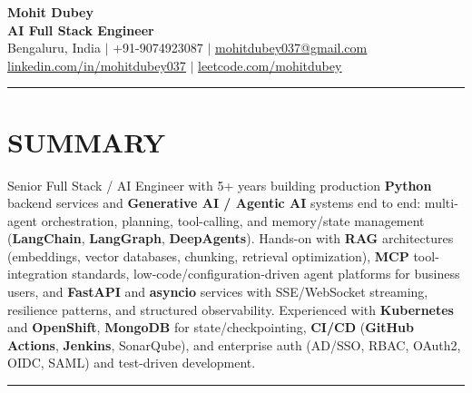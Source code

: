 \documentclass[a4paper]{article}
\newcommand{\sectionline}{
\begin{center}
\vspace{-9pt}
\rule{1\textwidth}{0.5pt}
\end{center}
\vspace{1pt}
}
\begin{document}
\begin{center}
    \textbf{\Huge Mohit Dubey} \\ \vspace{4pt}
    \textbf{AI Full Stack Engineer } \\ \vspace{6pt}
    \small Bengaluru, India $|$ +91-9074923087 $|$ \href{mailto:mohitdubey037@gmail.com}{\underline{mohitdubey037@gmail.com}} \\
    \href{https://www.linkedin.com/in/mohit-dubey-037/}{\underline{linkedin.com/in/mohitdubey037}} $|$ \href{https://leetcode.com/u/mohitdubey037/}
    {\underline{leetcode.com/mohitdubey}}
\end{center}


\sectionline
\section*{SUMMARY}
Senior Full Stack / AI Engineer with 5+ years building production \textbf{Python} backend services and \textbf{Generative AI / Agentic AI} systems end to end: multi-agent orchestration, planning, tool-calling, and memory/state management (\textbf{LangChain}, \textbf{LangGraph}, \textbf{DeepAgents}). Hands-on with \textbf{RAG} architectures (embeddings, vector databases, chunking, retrieval optimization), \textbf{MCP} tool-integration standards, low-code/configuration-driven agent platforms for business users, and \textbf{FastAPI} and \textbf{asyncio} services with SSE/WebSocket streaming, resilience patterns, and structured observability. Experienced with \textbf{Kubernetes} and \textbf{OpenShift}, \textbf{MongoDB} for state/checkpointing, \textbf{CI/CD} (\textbf{GitHub Actions}, \textbf{Jenkins}, SonarQube), and enterprise auth (AD/SSO, RBAC, OAuth2, OIDC, SAML) and test-driven development.

\sectionline
\end{document}
